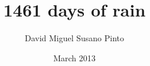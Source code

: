 \documentclass[a4paper,twoside,openright,draft]{memoir}
\author{David Miguel Susano Pinto}
\date{March 2013} %
\title{1461 days of rain} %
\begin{document}
  \frontmatter

  \maketitle

  \clearpage
  \tableofcontents
  \clearpage
  \listoffigures
  \clearpage
  \listoftables

  \clearpage
  \begin{abstract}  %

  \end{abstract}

  \mainmatter

  
  
  
  
  
  
  

  \backmatter

  
  
\end{document}
